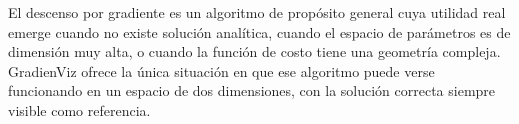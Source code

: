 \documentclass[12pt, a4paper]{article}
\begin{document}
\bigskip

El descenso por gradiente es un algoritmo de propósito general cuya utilidad
real emerge cuando no existe solución analítica, cuando el espacio de parámetros
es de dimensión muy alta, o cuando la función de costo tiene una geometría
compleja. GradienViz ofrece la única situación en que ese algoritmo puede
verse funcionando en un espacio de dos dimensiones, con la solución correcta
siempre visible como referencia.
\end{document}
